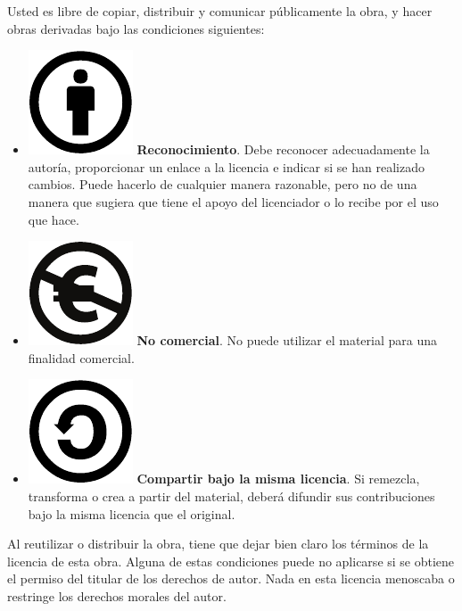Usted es libre de copiar, distribuir y comunicar públicamente la obra,
y hacer obras derivadas bajo las condiciones siguientes:
\begin{itemize}
\item \includegraphics[scale=0.35]{../figs/by} \textbf{Reconocimiento}.
Debe reconocer adecuadamente la autoría, proporcionar un enlace a la licencia e indicar si se han realizado cambios. Puede hacerlo de cualquier manera razonable, pero no de una manera que sugiera que tiene el apoyo del licenciador o lo recibe por el uso que hace.
\item \includegraphics[scale=0.35]{../figs/nc-eu} \textbf{No comercial}.
No puede utilizar el material para una finalidad comercial.
\item \includegraphics[scale=0.35]{../figs/sa} \textbf{Compartir bajo la
misma licencia}.  Si remezcla, transforma o crea a partir del material, deberá difundir sus contribuciones bajo la misma licencia que el original.
\end{itemize}
Al reutilizar o distribuir la obra, tiene que dejar bien claro los
términos de la licencia de esta obra. Alguna de estas condiciones
puede no aplicarse si se obtiene el permiso del titular de los derechos
de autor. Nada en esta licencia menoscaba o restringe los derechos
morales del autor.

